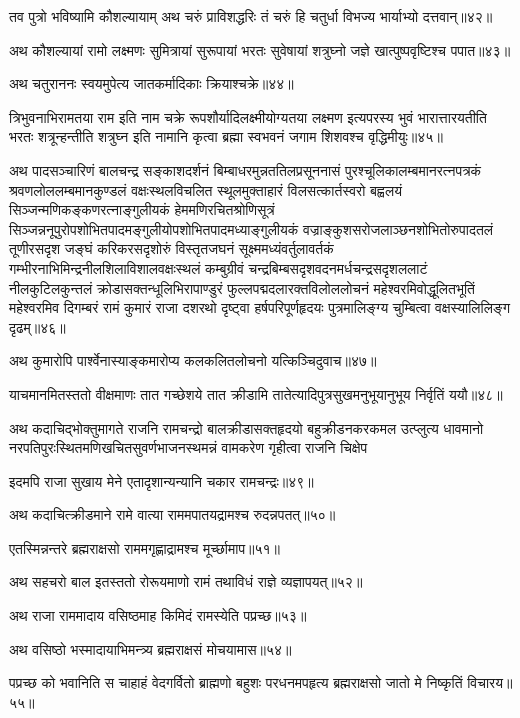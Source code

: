\begin{flushleft}
तव पुत्रो भविष्यामि कौशल्यायाम् अथ चरुं प्राविशद्धरिः तं चरुं हि चतुर्धा विभज्य भार्याभ्यो दत्तवान्॥४२॥

अथ कौशल्यायां रामो लक्ष्मणः सुमित्रायां सुरूपायां भरतः सुवेषायां शत्रुघ्नो जज्ञे खात्पुष्पवृष्टिश्च पपात॥४३॥

अथ चतुराननः स्वयमुपेत्य जातकर्मादिकाः क्रियाश्चक्रे॥४४॥

त्रिभुवनाभिरामतया राम इति नाम चक्रे रूपशौर्यादिलक्ष्मीयोग्यतया लक्ष्मण इत्यपरस्य भुवं भारात्तारयतीति भरतः शत्रून्हन्तीति शत्रुघ्न इति नामानि कृत्वा ब्रह्मा स्वभवनं जगाम शिशवश्च वृद्धिमीयुः॥४५॥

अथ पादसञ्चारिणं बालचन्द्र सङ्काशदर्शनं बिम्बाधरमुन्नततिलप्रसूननासं पुरश्चूलिकालम्बमानरत्नपत्रकं श्रवणलोललम्बमानकुण्डलं वक्षःस्थलविचलित स्थूलमुक्ताहारं विलसत्कार्तस्वरो बह्वलयं सिञ्जन्मणिकङ्कणरत्नाङ्गुलीयकं हेममणिरचितश्रोणिसूत्रं सिञ्जन्ननूपुरोपशोभितपादमङ्गुलीयोपशोभितपादमध्याङ्गुलीयकं वज्राङ्कुशसरोजलाञ्छनशोभितोरुपादतलं तूणीरसदृश जङ्घं करिकरसदृशोरुं विस्तृतजघनं सूक्ष्ममध्यंवर्तुलावर्तकं गम्भीरनाभिमिन्द्रनीलशिलाविशालवक्षःस्थलं कम्बुग्रीवं चन्द्रबिम्बसदृशवदनमर्धचन्द्रसदृशललाटं नीलकुटिलकुन्तलं क्रोडासक्तन्धूलिभिरापाण्डुरं फुल्लपद्मदलारक्तविलोललोचनं महेश्वरमिवोद्धूलितभूतिं महेश्वरमिव दिगम्बरं रामं कुमारं राजा दशरथो दृष्ट्वा हर्षपरिपूर्णहृदयः पुत्रमालिङ्ग्य चुम्बित्वा वक्षस्यालिलिङ्ग दृढम्॥४६॥

अथ कुमारोपि पार्श्वेनास्याङ्कमारोप्य कलकलितलोचनो यत्किञ्चिदुवाच॥४७॥

याचमानमितस्ततो वीक्षमाणः तात गच्छेशये तात क्रीडामि तातेत्यादिपुत्रसुखमनुभूयानुभूय निर्वृतिं ययौ॥४८॥

अथ कदाचिद्भोक्तुमागते राजनि रामचन्द्रो बालक्रीडासक्तहृदयो बहुक्रीडनकरकमल उत्प्लुत्य धावमानो नरपतिपुरःस्थितमणिखचितसुवर्णभाजनस्थमन्नं वामकरेण गृहीत्वा राजनि चिक्षेप

इदमपि राजा सुखाय मेने एतादृशान्यन्यानि चकार रामचन्द्रः॥४९॥

अथ कदाचित्क्रीडमाने रामे वात्या राममपातयद्रामश्च रुदन्नपतत्॥५०॥

एतस्मिन्नन्तरे ब्रह्मराक्षसो राममगृह्णाद्रामश्च मूर्च्छामाप॥५१॥

अथ सहचरो बाल इतस्ततो रोरूयमाणो रामं तथाविधं राज्ञे व्यज्ञापयत्॥५२॥

अथ राजा राममादाय वसिष्ठमाह किमिदं रामस्येति पप्रच्छ॥५३॥

अथ वसिष्ठो भस्मादायाभिमन्त्र्य ब्रह्मराक्षसं मोचयामास॥५४॥

पप्रच्छ को भवानिति स चाहाहं वेदगर्वितो ब्राह्मणो बहुशः परधनमपहृत्य ब्रह्मराक्षसो जातो मे निष्कृतिं विचारय॥५५॥



\end{flushleft}
